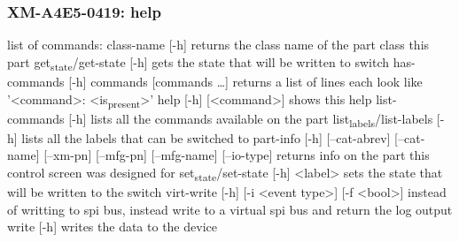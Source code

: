 \documentclass[11pt]{article}
\begin{document}
\subsubsection{XM-A4E5-0419: help}
\label{sec:orgd4866c6}
list of commands:
  class-name [-h]
    returns the class name of the part class this part
  get\textsubscript{state}/get-state [-h]
    gets the state that will be written to switch
  has-commands [-h] commands [commands \ldots{}]
    returns a list of lines each look like '<command>: <is\textsubscript{present}>'
  help [-h] [<command>]
    shows this help
  list-commands [-h]
    lists all the commands available on the part
  list\textsubscript{labels}/list-labels [-h]
    lists all the labels that can be switched to
  part-info  [-h] [--cat-abrev] [--cat-name] [--xm-pn] [--mfg-pn] [--mfg-name]
          [--io-type]
    returns info on the part this control screen was designed for
  set\textsubscript{state}/set-state [-h] <label>
    sets the state that will be written to the switch
  virt-write [-h] [-i <event type>] [-f <bool>]
    instead of writting to spi bus, instead write to a virtual spi bus
    and return the log output
  write [-h]
    writes the data to the device
\end{document}
